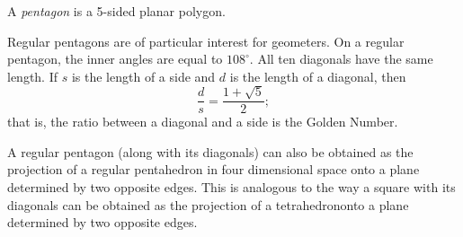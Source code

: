 \documentclass[12pt]{article}
\begin{document}
A \emph{pentagon} is a 5-sided planar polygon.

Regular pentagons are of particular interest for geometers.
On a regular pentagon, the inner angles are equal to $108^\circ$.
All ten diagonals have the same length. If $s$ is the length of a side and $d$ is the length of a diagonal, then 
$$\frac{d}{s}=\frac{1+\sqrt{5}}{2};$$
that is, the ratio between a diagonal and a side is the Golden Number.

A regular pentagon (along with its diagonals) can also be obtained as
the projection of a regular pentahedron in four dimensional space
onto a plane determined by two opposite edges.
This is analogous to the way a square with its diagonals can be obtained 
as the projection of a tetrahedrononto a plane determined by two opposite edges.
\end{document}
